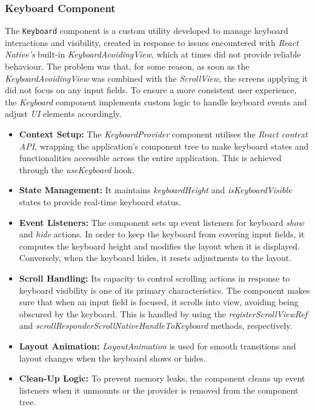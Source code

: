 \subsubsection{Keyboard Component}

The \texttt{Keyboard} component is a custom utility developed to manage keyboard interactions and visibility, created in response to issues encountered with \textit{React Native's} built-in \textit{KeyboardAvoidingView}, which at times did not provide reliable behaviour. The problem was that, for some reason, as soon as the \textit{KeyboardAvoidingView} was combined with the \textit{ScrollView}, the screens applying it did not focus on any input fields. To ensure a more consistent user experience, the \textit{Keyboard} component implements custom logic to handle keyboard events and adjust \textit{UI} elements accordingly. 

\begin{itemize}
    \item \textbf{Context Setup:} The \textit{KeyboardProvider} component utilises the \textit{React context API}, wrapping the application's component tree to make keyboard states and functionalities accessible across the entire application. This is achieved through the \textit{useKeyboard} hook.
    \item \textbf{State Management:} It maintains \textit{keyboardHeight} and \textit{isKeyboardVisible} states to provide real-time keyboard status.
    \item \textbf{Event Listeners:} The component sets up event listeners for keyboard \textit{show} and \textit{hide} actions. In order to keep the keyboard from covering input fields, it computes the keyboard height and modifies the layout when it is displayed. Conversely, when the keyboard hides, it resets adjustments to the layout.
    \item \textbf{Scroll Handling:} Its capacity to control scrolling actions in response to keyboard visibility is one of its primary characteristics. The component makes sure that when an input field is focused, it scrolls into view, avoiding being obscured by the keyboard. This is handled by using the \textit{registerScrollViewRef} and \textit{scrollResponderScrollNativeHandleToKeyboard} methods, respectively.
    \item \textbf{Layout Animation:} \textit{LayoutAnimation} is used for smooth transitions and layout changes when the keyboard shows or hides.
    \item \textbf{Clean-Up Logic:} To prevent memory leaks, the component cleans up event listeners when it unmounts or the provider is removed from the component tree.
\end{itemize}

